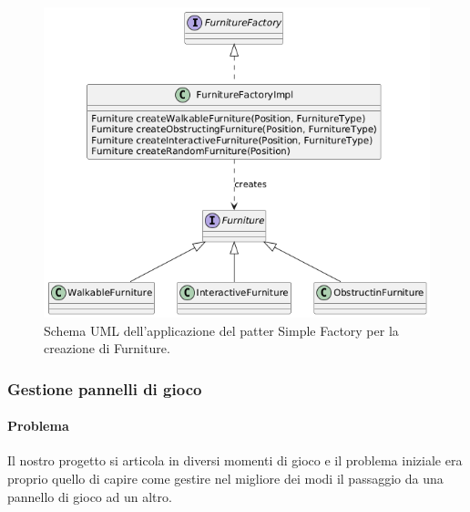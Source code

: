 \documentclass[a4paper,12pt]{report}
\begin{document}
\begin{figure}[H]
	\centering{}
	\includegraphics[width=\textwidth]{img/furnitureSimpleFactory.png}
	\caption{Schema UML dell'applicazione del patter Simple Factory per la creazione di Furniture.}
	\label{img:furnitureSimpleFactory}
\end{figure}

\subsubsection{Gestione pannelli di gioco}

\paragraph{Problema} Il nostro progetto si articola in diversi momenti di gioco e il problema iniziale
era proprio quello di capire come gestire nel migliore dei modi il passaggio da una pannello di gioco ad 
un altro.
\end{document}
